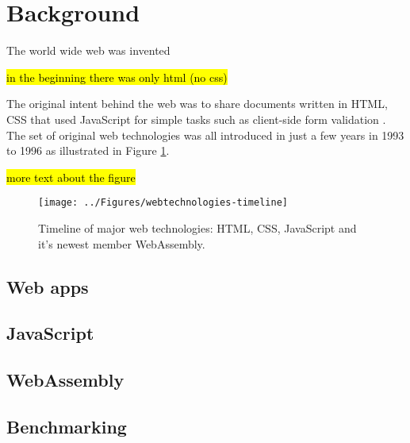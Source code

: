 \section{Background}
\label{background}

The world wide web was invented 

\hl{in the beginning there was only html (no css)}

The original intent behind the web was to share documents written in HTML, CSS that used JavaScript for simple tasks such as client-side form validation \parencite{Zakai2018,Moller2018}. The set of original web technologies was all introduced in just a few years in 1993 to 1996 as illustrated in Figure \ref{figure:webtechnologies-timeline}.

\hl{more text about the figure}



\begin{figure}[!h]
\centering
\texttt{[image: ../Figures/webtechnologies-timeline]}
\caption{Timeline of major web technologies: HTML, CSS, JavaScript and it's newest member WebAssembly.}
\label{figure:webtechnologies-timeline}
\end{figure}

\subsection{Web apps}


\subsection{JavaScript}


\subsection{WebAssembly}


\subsection{Benchmarking}

